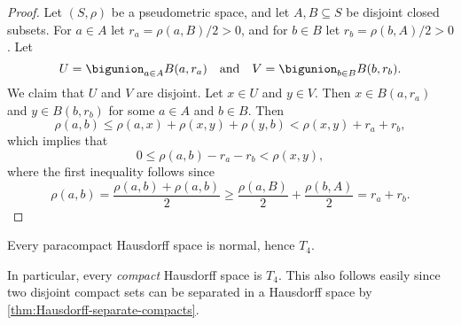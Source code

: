 \documentclass[article, a4paper, 11pt, oneside]{memoir}
\numberwithin{equation}{chapter}
\begin{document}
\begin{proof}
    Let $(S,\rho)$ be a pseudometric space, and let $A, B \subseteq S$ be disjoint closed subsets. For $a \in A$ let $r_a = \rho(a,B)/2 > 0$, and for $b \in B$ let $r_b = \rho(b,A)/2 > 0$. Let
    \begin{equation*}
        U = \bigunion_{a \in A} B(a,r_a)
        \quad \text{and} \quad
        V = \bigunion_{b \in B} B(b,r_b).
    \end{equation*}
    We claim that $U$ and $V$ are disjoint. Let $x \in U$ and $y \in V$. Then $x \in B(a,r_a)$ and $y \in B(b,r_b)$ for some $a \in A$ and $b \in B$. Then
    \begin{equation*}
        \rho(a,b)
            \leq \rho(a,x) + \rho(x,y) + \rho(y,b)
            < \rho(x,y) + r_a + r_b,
    \end{equation*}
    which implies that
    \begin{equation*}
        0
            \leq \rho(a,b) - r_a - r_b
            < \rho(x,y),
    \end{equation*}
    where the first inequality follows since
    \begin{equation*}
        \rho(a,b)
            = \frac{\rho(a,b) + \rho(a,b)}{2}
            \geq \frac{\rho(a,B)}{2} + \frac{\rho(b,A)}{2}
            = r_a + r_b.
    \end{equation*}
\end{proof}



\begin{proposition}
    \label{thm:paracompact-Hausdorff-is-normal}
    Every paracompact Hausdorff space is normal, hence $T_4$.
\end{proposition}
%
In particular, every \emph{compact} Hausdorff space is $T_4$. This also follows easily since two disjoint compact sets can be separated in a Hausdorff space by \cref{thm:Hausdorff-separate-compacts}.

\newcommand{\bbU}{\mathbb{U}}
\newcommand{\bbV}{\mathbb{V}}
\end{document}

